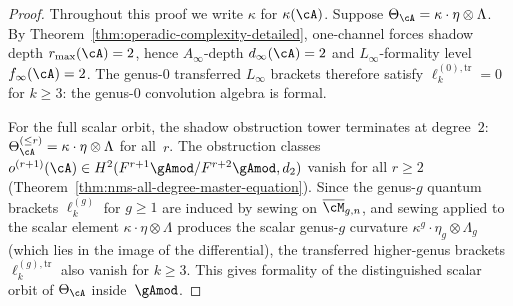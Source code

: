 \begin{proof}
Throughout this proof we write $\kappa$ for $\kappa(\cA)$.
Suppose $\Theta_{\cA} = \kappa \cdot \eta \otimes \Lambda$.
By Theorem~\ref{thm:operadic-complexity-detailed},
one-channel forces shadow depth $r_{\max}(\cA) = 2$,
hence $A_\infty$-depth $d_\infty(\cA) = 2$ and
$L_\infty$-formality level $f_\infty(\cA) = 2$.
The genus-$0$ transferred $L_\infty$ brackets therefore
satisfy $\ell_k^{(0),\mathrm{tr}} = 0$ for $k \geq 3$:
the genus-$0$ convolution algebra is formal.

For the full scalar orbit, the shadow
obstruction tower terminates at degree~$2$:
$\Theta_{\cA}^{(\le r)} = \kappa \cdot \eta \otimes \Lambda$
for all~$r$. The obstruction classes
$o^{(r+1)}(\cA) \in H^2(F^{r+1}\gAmod / F^{r+2}\gAmod, d_2)$
vanish for all $r \geq 2$
(Theorem~\ref{thm:nms-all-degree-master-equation}).
Since the genus-$g$ quantum brackets $\ell_k^{(g)}$ for
$g \geq 1$ are induced by sewing on $\overline{\cM}_{g,n}$,
and sewing applied to the scalar element
$\kappa \cdot \eta \otimes \Lambda$ produces the scalar
genus-$g$ curvature $\kappa^g \cdot \eta_g \otimes \Lambda_g$
(which lies in the image of the differential), the transferred
higher-genus brackets
$\ell_k^{(g),\mathrm{tr}}$ also vanish for $k \geq 3$.
This gives formality of the distinguished scalar orbit of
$\Theta_{\cA}$ inside~$\gAmod$.
\end{proof}

